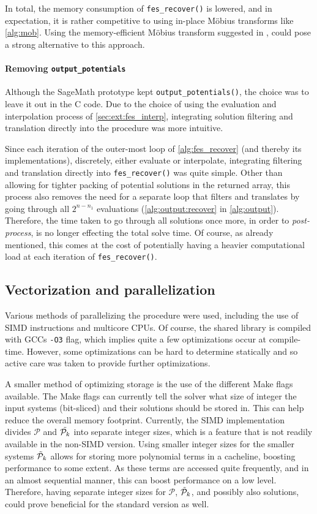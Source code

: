 In total, the memory consumption of \texttt{fes\_recover()} is lowered, and in expectation, it is rather competitive to using in-place Möbius transforms like \cref{alg:mob}. Using the memory-efficient Möbius transform suggested in \cite{eurocrypt-2021-30841}, could pose a strong alternative to this approach.

\paragraph*{Removing \texttt{output\_potentials}} Although the SageMath prototype kept \texttt{output\_potentials()}, the choice was to leave it out in the C code. Due to the choice of using the evaluation and interpolation process of \cref{sec:ext:fes_interp}, integrating solution filtering and translation directly into the procedure was more intuitive.

Since each iteration of the outer-most loop of \cref{alg:fes_recover} (and thereby its implementations), discretely, either evaluate or interpolate, integrating filtering and translation directly into \texttt{fes\_recover()} was quite simple. Other than allowing for tighter packing of potential solutions in the returned array, this process also removes the need for a separate loop that filters and translates by going through all $2^{n - n_1}$ evaluations (\cref{alg:output:recover} in \cref{alg:output}). Therefore, the time taken to go through all solutions once more, in order to \textit{post-process}, is no longer effecting the total solve time. Of course, as already mentioned, this comes at the cost of potentially having a heavier computational load at each iteration of \texttt{fes\_recover()}.

\subsection{Vectorization and parallelization} \label{sec:impl:opt:parallel}
Various methods of parallelizing the procedure were used, including the use of SIMD instructions and multicore CPUs. Of course, the shared library is compiled with GCCs \texttt{-O3} flag, which implies quite a few optimizations occur at compile-time. However, some optimizations can be hard to determine statically and so active care was taken to provide further optimizations. 

A smaller method of optimizing storage is the use of the different Make flags available. The Make flags can currently tell the solver what size of integer the input systems (bit-sliced) and their solutions should be stored in. This can help reduce the overall memory footprint. Currently, the SIMD implementation divides $\mathcal{P}$ and $\Tilde{\mathcal{P}_k}$ into separate integer sizes, which is a feature that is not readily available in the non-SIMD version. Using smaller integer sizes for the smaller systems $\Tilde{\mathcal{P}}_k$ allows for storing more polynomial terms in a cacheline, boosting performance to some extent. As these terms are accessed quite frequently, and in an almost sequential manner, this can boost performance on a low level. Therefore, having separate integer sizes for $\mathcal{P}$, $\Tilde{\mathcal{P}}_k$, and possibly also solutions, could prove beneficial for the standard version as well.


